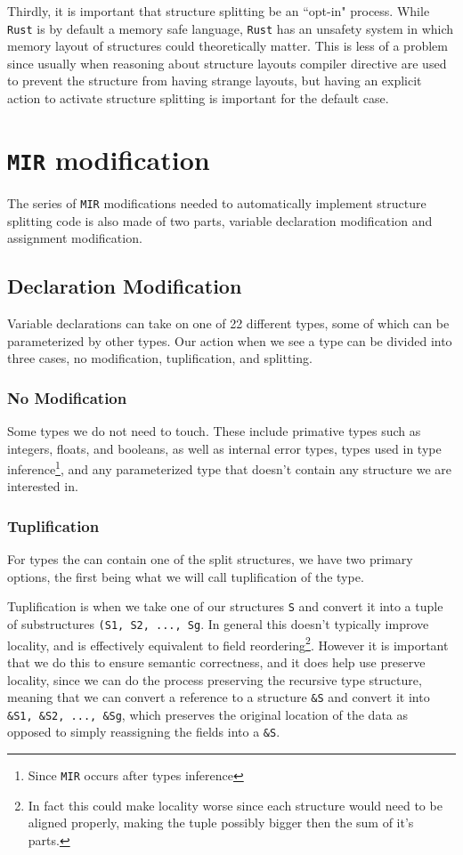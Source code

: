 \documentclass[12pt,oneside]{book}
\newcommand{\rustname}{{\texttt{Rust}}}
\def \rust {\rustname{}\xspace}
\newcommand{\mirname}{{\texttt{MIR}}}
\def \mir {\mirname{}\xspace}
\begin{document}
Thirdly, it is important that structure splitting be an ``opt-in" process.
While \rust is by default a memory safe language, \rust has an
unsafety system in which memory layout of structures could theoretically matter.
This is less of a problem since usually when reasoning about structure layouts
compiler directive are used to prevent the structure from having strange
layouts, but having an explicit action to activate structure
splitting is important for the default case. 

\section{\mir modification}

The series of \mir modifications needed to automatically implement structure
splitting code is also made of two parts, variable declaration modification and
assignment modification.

\subsection{Declaration Modification}

Variable declarations can take on one of 22 different types, some of which can
be parameterized by other types. Our action when we see a type can be divided
into three cases, no modification, tuplification, and splitting.

\subsubsection{No Modification}
Some types we do not need to touch. These include primative types such as
integers, floats, and booleans, as well as internal error types, types used in
type inference\footnote{Since \mir occurs after types inference}, and any
parameterized type that doesn't contain any structure we are interested in.

\subsubsection{Tuplification}
For types the can contain one of the split structures, we have two primary
options, the first being what we will call tuplification of the type.

Tuplification is when we take one of our structures \texttt{S} and convert it
into a tuple of substructures \texttt{(S1, S2, ..., Sg}. In general this 
doesn't typically improve locality, and is effectively equivalent to 
field reordering\footnote{In fact this could make locality worse since each
structure would need to be aligned properly, making the tuple possibly
bigger then the sum of it's parts.}. However it is important that we do this to
ensure semantic correctness, and it does help use preserve locality, since we can
do the process preserving the recursive type structure, meaning that
we can convert a reference to a structure \texttt{\&S} and convert it into 
\texttt{\&S1, \&S2, ..., \&Sg}, which preserves the original location of the 
data as opposed to simply reassigning the fields into a \texttt{\&S}.
\end{document}

